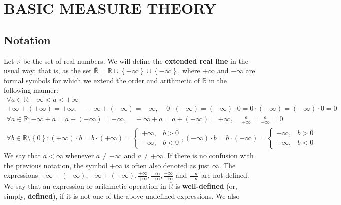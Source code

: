 
\chapter{BASIC MEASURE THEORY}\label{chapter:elementary measure theory}

\section{Notation}

Let \(\mathbb{R}\) be the set of real numbers. We will define the
\textbf{extended real line} in the usual way; that is, as the set
\(\overline{\mathbb{R}}=\mathbb{R}\cup\left\{+\infty\right\}\cup\left\{-\infty\right\}\), where
\(+\infty\) and \(-\infty\) are formal symbols for which we extend the order and arithmetic of \(\mathbb{R}\) in the following manner:
\[
\begin{array}{l}
		\forall a\in\mathbb{R}\colon-\infty<a<+\infty\\
		+\infty+\left(+\infty\right)=+\infty,~~~~~ -\infty+(-\infty)=-\infty
		,~~~~~ 0\cdot\left(+\infty\right)=\left(+\infty\right)\cdot0=0\cdot(-\infty)=(-\infty)\cdot0=0\\
		\forall a\in\mathbb{R}\colon -\infty+a=a+(-\infty)=-\infty,~~~~~+\infty+a=a+(+\infty)=+\infty,~~~~~\frac{a}{+\infty}=\frac{a}{-\infty}=0\\
		\forall b\in\overline{\mathbb{R}}\setminus\left\{0\right\}\colon \left(+\infty\right)\cdot b=b\cdot\left(+\infty\right)=\left\{
		\begin{array}{rl} +\infty,&b>0\\ -\infty,&b<0
		\end{array} \right.,  (-\infty)\cdot b=b\cdot(-\infty)=\left\{
		\begin{array}{rl} -\infty,&b>0\\ +\infty,&b<0
		\end{array} \right.
\end{array}
\]
We say that \(a<\infty\) whenever \(a\neq-\infty\) and \(a\neq+\infty\). If
there is no confusion with the previous notation, the symbol \(+\infty\) is
often also denoted as just \(\infty\). The expressions
\(+\infty+(-\infty), -\infty+(+\infty), \frac{+\infty}{+\infty}, \frac{-\infty}{+\infty}, \frac{+\infty}{-\infty}\)
and \(\frac{-\infty}{-\infty}\) are not defined. We say that an expression or
arithmetic operation in \(\overline{\mathbb{R}}\) is \textbf{well-defined} (or, simply,
\textbf{defined}), if it is not one of the above undefined expressions.  We also
